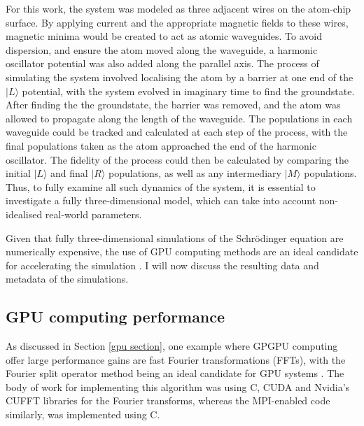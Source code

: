For this work, the system was modeled as three adjacent wires on the atom-chip surface. By applying current and the appropriate magnetic fields to these wires, magnetic minima would be created to act as atomic waveguides. To avoid dispersion, and ensure the atom moved along the waveguide, a harmonic oscillator potential was also added along the parallel axis. The process of simulating the system involved localising the atom by a barrier at one end of the $|L\rangle$ potential, with the system evolved in imaginary time to find the groundstate. After finding the the groundstate, the barrier was removed, and the atom was allowed to propagate along the length of the waveguide. The populations in each waveguide could be tracked and calculated at each step of the process, with the final populations taken as the atom approached the end of the harmonic oscillator. The fidelity of the process could then be calculated by comparing the initial $| L \rangle$ and final $|R \rangle$ populations, as well as any intermediary $| M \rangle$ populations. Thus, to fully examine all such dynamics of the system, it is essential to investigate a fully three-dimensional model, which can take into account non-idealised real-world parameters.

Given that fully three-dimensional simulations of the Schr\"odinger equation are numerically expensive, the use of GPU computing methods are an ideal candidate for accelerating the simulation \cite{Bauke:11}. I will now discuss the resulting data and metadata of the simulations.





\subsection{GPU computing performance}

As discussed in Section \ref{gpu section}, one example where GPGPU computing offer large performance gains are fast Fourier transformations (FFTs), with the Fourier split operator method being an ideal candidate for GPU systems \cite{Bauke:11}. The body of work for implementing this algorithm was using C, CUDA and Nvidia's CUFFT libraries for the Fourier transforms, whereas the MPI-enabled code similarly, was implemented using C.

